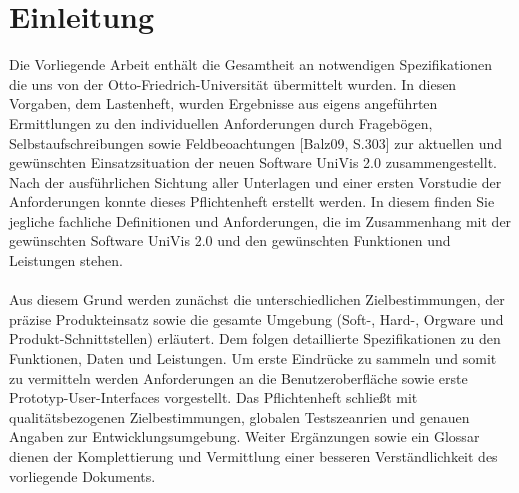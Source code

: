 \section{Einleitung}
\label{sec:Einleitung}

Die Vorliegende Arbeit enthält die Gesamtheit an notwendigen Spezifikationen die uns von der Otto-Friedrich-Universität übermittelt wurden. 
In diesen Vorgaben, dem Lastenheft, wurden Ergebnisse aus eigens angeführten Ermittlungen zu den individuellen Anforderungen durch Fragebögen, Selbstaufschreibungen sowie Feldbeoachtungen [Balz09, S.303] zur aktuellen und gewünschten Einsatzsituation der neuen Software UniVis 2.0 zusammengestellt.
Nach der ausführlichen Sichtung aller Unterlagen und einer ersten Vorstudie der Anforderungen konnte dieses Pflichtenheft erstellt werden. In diesem finden Sie jegliche fachliche Definitionen und Anforderungen, die im Zusammenhang mit der gewünschten Software UniVis 2.0 und den gewünschten Funktionen und Leistungen stehen.
\\
\\
Aus diesem Grund werden zunächst die unterschiedlichen Zielbestimmungen, der präzise Produkteinsatz sowie die gesamte Umgebung (Soft-, Hard-, Orgware und Produkt-Schnittstellen) erläutert.
Dem folgen detaillierte Spezifikationen zu den Funktionen, Daten und Leistungen. Um erste Eindrücke zu sammeln und somit zu vermitteln werden Anforderungen an die Benutzeroberfläche sowie erste Prototyp-User-Interfaces vorgestellt. Das Pflichtenheft schließt mit qualitätsbezogenen Zielbestimmungen, globalen Testszeanrien und genauen Angaben zur Entwicklungsumgebung.
Weiter Ergänzungen sowie ein Glossar dienen der Komplettierung und Vermittlung einer besseren Verständlichkeit des vorliegende Dokuments.


